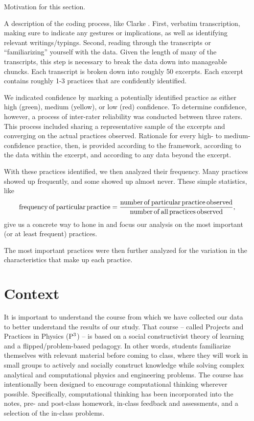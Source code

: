 \documentclass{msuphddissertation}
\begin{document}
\begin{doublespace}
Motivation for this section.

A description of the coding process, like Clarke \cite{Braun2008}.  First, verbatim transcription, making sure to indicate any gestures or implications, as well as identifying relevant writings/typings.  Second, reading through the transcripts or ``familiarizing'' yourself with the data.  Given the length of many of the transcripts, this step is necessary to break the data down into manageable chuncks.  Each transcript is broken down into roughly 50 excerpts.  Each excerpt contains roughly 1-3 practices that are confidently identified.

We indicated confidence by marking a potentially identified practice as either high (green), medium (yellow), or low (red) confidence.  To determine confidence, however, a process of inter-rater reliability was conducted between three raters.  This process included sharing a representative sample of the excerpts and converging on the actual practices observed.  Rationale for every high- to medium-confidence practice, then, is provided according to the framework, according to the data within the excerpt, and according to any data beyond the excerpt.

With these practices identified, we then analyzed their frequency.  Many practices showed up frequently, and some showed up almost never.  These simple statistics, like $${\rm frequency\,of\,particular\,practice}=\frac{\rm number\,of\,particular\,practice\,observed}{\rm number\,of\,all\,practices\,observed},$$ give us a concrete way to hone in and focus our analysis on the most important (or at least frequent) practices.

The most important practices were then further analyzed for the variation in the characteristics that make up each practice.

%
%

\chapter{Context}\label{CH3:Context}

It is important to understand the course from which we have collected our data to better understand the results of our study.  That course -- called Projects and Practices in Physics (${\rm P}^{3}$) -- is based on a social constructivist theory of learning and a flipped/problem-based pedagogy.  In other words, students familiarize themselves with relevant material before coming to class, where they will work in small groups to actively and socially construct knowledge while solving complex analytical and computational physics and engineering problems.  The course has intentionally been designed to encourage computational thinking wherever possible.  Specifically, computational thinking has been incorporated into the notes, pre- and post-class homework, in-class feedback and assessments, and a selection of the in-class problems.


\end{doublespace}
\end{document}
